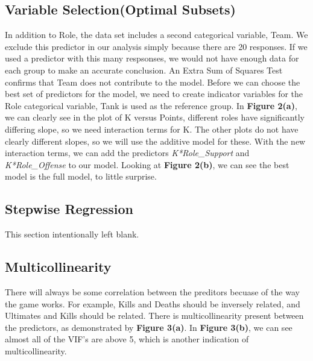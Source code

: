 \documentclass[10pt,letterpaper]{article}
\begin{document}
	\subsection{Variable Selection(Optimal Subsets)}
	In addition to Role, the data set includes a second categorical variable, Team. We exclude this predictor in our analysis simply because there are 20 responses. If we used a predictor with this many respsonses, we would not have enough data for each group to make an accurate conclusion. An Extra Sum of Squares Test confirms that Team does not contribute to the model. Before we can choose the best set of predictors for the model, we need to create indicator variables for the Role categorical variable, Tank is used as the reference group. In \textbf{Figure 2(a)}, we can clearly see in the plot of K versus Points, different roles have significantly differing slope, so we need interaction terms for K. The other plots do not have clearly different slopes, so we will use the additive model for these. With the new interaction terms, we can add the predictors \textit{K*Role\_Support} and \textit{K*Role\_Offense} to our model. Looking at \textbf{Figure 2(b)}, we can see the best model is the full model, to little surprise.
	\begin{figure}[h]
		\caption{}
	\end{figure}
	\FloatBarrier
	\subsection{Stepwise Regression}
	This section intentionally left blank.
 	\subsection{Multicollinearity}
 	There will always be some correlation between the preditors becuase of the way the game works. For example, Kills and Deaths should be inversely related, and Ultimates and Kills should be related. There is multicollinearity present between the predictors, as demonstrated by \textbf{Figure 3(a)}. In \textbf{Figure 3(b)}, we can see almost all of the VIF's are above 5, which is another indication of multicollinearity.
 	\begin{figure}[h]
	 	\centering
		\caption{}
	\end{figure}
	\FloatBarrier
\end{document}
